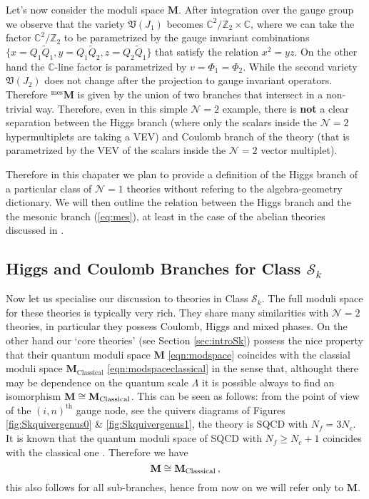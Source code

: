 \documentclass[main.tex]{subfiles}
\begin{document}
Let's now consider the moduli space $\mathbf{M}$. After integration over the gauge group we observe that the variety $\mathfrak{V}(J_1)$ becomes $\mathbb{C}^2/\mathbb{Z}_2 \times \mathbb{C}$, where we can take the factor $\mathbb{C}^2/\mathbb{Z}_2$ to be parametrized by the gauge invariant combinations $\{x=Q_1\widetilde{Q}_1, y=Q_1\widetilde{Q}_2, z=Q_2\widetilde{Q}_1 \}$  that satisfy the relation $x^2=yz$. On the other hand the $\mathbb{C}$-line  factor is parametrized by $v=\Phi_1=\Phi_2$. While the second variety $\mathfrak{V}(J_2)$ does not change after the projection to gauge invariant operators. Therefore ${}^{\text{mes}}\mathbf{M}$ is given by the union of two branches that intersect in a non-trivial way. Therefore, even in this simple $\mathcal{N}=2$ example, there is \textbf{not} a clear separation between the Higgs branch (where only the scalars inside the $\mathcal{N}=2$ hypermultiplets are taking a VEV) and Coulomb branch of the theory (that is parametrized by the VEV of the scalars inside the $\mathcal{N}=2$ vector multiplet).

 
Therefore in this chapater we plan to provide a definition of the Higgs branch of a particular class of $\mathcal{N}=1$ theories without refering to the algebra-geometry dictionary. We will then outline the relation between the Higgs branch and the the mesonic branch (\ref{eq:mes}), at least in the case of the abelian theories discussed in \cite{Forcella:2008bb}.

\subsection{Higgs and Coulomb Branches for Class \texorpdfstring{$\mathcal{S}_k$}{Sk}}
\label{sec:hc}
Now let us specialise our discussion to theories in Class $\mathcal{S}_k$.
The full moduli space for these theories is typically very rich. They share many similarities with $\mathcal{N}=2$ theories, in particular they possess Coulomb, Higgs and mixed phases. On the other hand our `core theories' (see Section \ref{sec:introSk}) possess the nice property that their quantum moduli space $\mathbf{M}$ \eqref{eqn:modspace} coincides with the classial moduli space $\mathbf{M}_{\text{Classical}}$ \eqref{eqn:modspaceclassical} in the sense that, althought there may be dependence on the quantum scale $\Lambda$ it is possible always to find an isomorphism $\mathbf{M}\cong\mathbf{M}_{\text{Classical}}$. This can be seen as follows: from the point of view of the $(i,n)^{\text{th}}$ gauge node, see the quivers diagrams of Figures \ref{fig:Skquivergenus0} \& \ref{fig:Skquivergenus1}, the theory is SQCD with $N_f=3N_c$. It is known that the quantum moduli space of SQCD with $N_f\geq N_c+1$ coincides with the classical one \cite{Seiberg:1994bz}. Therefore we have
\begin{equation}
\mathbf{M}\cong\mathbf{M}_{\text{Classical}}\,,
\end{equation}
this also follows for all sub-branches, hence from now on we will refer only to $\mathbf{M}$.
\end{document}
